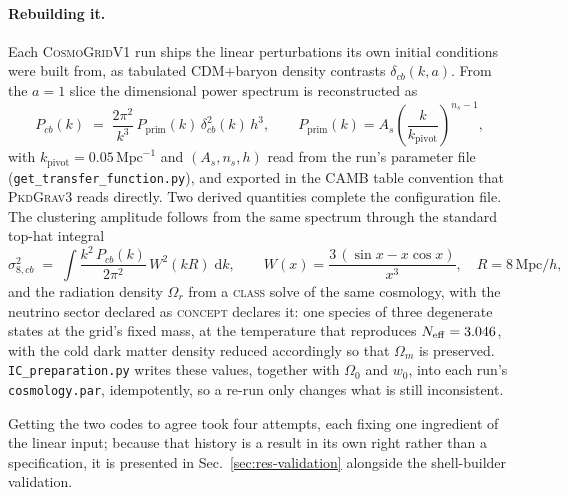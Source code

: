 \documentclass{report}
\begin{document}
\paragraph{Rebuilding it.} Each \textsc{CosmoGridV1} run ships the linear perturbations its own
initial conditions were built from, as tabulated CDM+baryon density contrasts
$\delta_{cb}(k, a)$. From the $a=1$ slice the dimensional power spectrum is
reconstructed as
\begin{equation}
  P_{cb}(k) \;=\; \frac{2\pi^2}{k^3}\, P_{\mathrm{prim}}(k)\, \delta_{cb}^2(k)\, h^3,
  \qquad P_{\mathrm{prim}}(k) = A_s \left(\frac{k}{k_{\mathrm{pivot}}}\right)^{n_s - 1},
  \label{eq:pk_reconstruct}
\end{equation}
with $k_{\mathrm{pivot}} = 0.05\,\mathrm{Mpc}^{-1}$ and $(A_s, n_s, h)$ read from the
run's parameter file (\texttt{get\_transfer\_function.py}), and exported in the
\textsc{CAMB} table convention that \textsc{PkdGrav3} reads directly. Two
derived quantities complete the configuration file. The clustering amplitude follows
from the same spectrum through the standard top-hat integral
\begin{equation}
  \sigma_{8,cb}^2 \;=\; \int \frac{k^2\,P_{cb}(k)}{2\pi^2}\, W^2(kR)\;\mathrm{d}k,
  \qquad W(x) = \frac{3\,(\sin x - x\cos x)}{x^{3}},\quad R = 8\,\mathrm{Mpc}/h,
  \label{eq:sigma8}
\end{equation}
and the radiation density $\Omega_r$ from a \textsc{class} solve of the same cosmology,
with the neutrino sector declared as \textsc{concept} declares it: one species of three
degenerate states at the grid's fixed mass, at the temperature that reproduces
$N_{\rm eff} = 3.046$, with the cold dark matter density reduced accordingly so that
$\Omega_m$ is preserved. \texttt{IC\_preparation.py} writes these values, together
with $\Omega_0$ and $w_0$, into each run's \texttt{cosmology.par}, idempotently, so a
re-run only changes what is still inconsistent.

Getting the two codes to agree took four attempts, each fixing one ingredient of the
linear input; because that history is a result in its own right rather than a
specification, it is presented in Sec.~\ref{sec:res-validation} alongside the shell-builder
validation.
\end{document}
